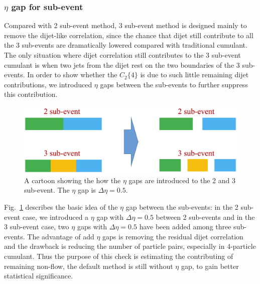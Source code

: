 \subsubsection{$\eta$ gap for sub-event}
Compared with 2 sub-event method, 3 sub-event method is designed mainly to remove the dijet-like correlation, since the chance that dijet still contribute to all the 3 sub-events are dramatically lowered compared with traditional cumulant. The only situation where dijet correlation still contributes to the 3 sub-event cumulant is when two jets from the dijet rest on the two boundaries of the 3 sub-events. In order to show whether the $C_{2}\{4\}$ is due to such little remaining dijet contributions, we introduced $\eta$ gaps between the sub-events to further suppress this contribution.

\begin{figure}[H]
\centering
\includegraphics[width=0.8\linewidth]{figs/sec_sys/pp13/sys_pp13_gap_eg.png}
\caption{A cartoon showing the how the $\eta$ gaps are introduced to the 2 and 3 sub-event. The $\eta$ gap is $\Delta\eta=0.5$.}
\label{fig:sys_pp13_gap_eg}
\end{figure}
Fig.~\ref{fig:sys_pp13_gap_eg} describes the basic idea of the $\eta$ gap between the sub-events: in the 2 sub-event case, we introduced a $\eta$ gap with $\Delta\eta=0.5$ between 2 sub-events and in the 3 sub-event case, two $\eta$ gaps with $\Delta\eta=0.5$ have been added among three sub-events. The advantage of add $\eta$ gaps is removing the residual dijet correlation and the drawback is reducing the number of particle pairs, especially in 4-particle cumulant. Thus the purpose of this check is estimating the contributing of remaining non-flow, the default method is still without $\eta$ gap, to gain better statistical significance.

